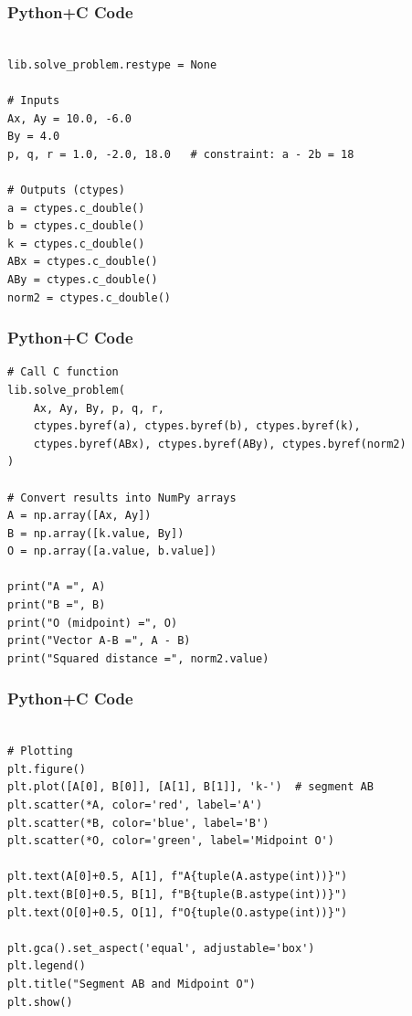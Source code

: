 \documentclass{beamer}
\begin{document}
\begin{frame}[fragile]
    \frametitle{Python+C Code}
    \begin{lstlisting}

lib.solve_problem.restype = None

# Inputs
Ax, Ay = 10.0, -6.0
By = 4.0
p, q, r = 1.0, -2.0, 18.0   # constraint: a - 2b = 18

# Outputs (ctypes)
a = ctypes.c_double()
b = ctypes.c_double()
k = ctypes.c_double()
ABx = ctypes.c_double()
ABy = ctypes.c_double()
norm2 = ctypes.c_double()

\end{lstlisting}
\end{frame}
\begin{frame}[fragile]
    \frametitle{Python+C Code}
    \begin{lstlisting}
# Call C function
lib.solve_problem(
    Ax, Ay, By, p, q, r,
    ctypes.byref(a), ctypes.byref(b), ctypes.byref(k),
    ctypes.byref(ABx), ctypes.byref(ABy), ctypes.byref(norm2)
)

# Convert results into NumPy arrays
A = np.array([Ax, Ay])
B = np.array([k.value, By])
O = np.array([a.value, b.value])

print("A =", A)
print("B =", B)
print("O (midpoint) =", O)
print("Vector A-B =", A - B)
print("Squared distance =", norm2.value)
\end{lstlisting}
\end{frame}
\begin{frame}[fragile]
    \frametitle{Python+C Code}
    \begin{lstlisting}

# Plotting
plt.figure()
plt.plot([A[0], B[0]], [A[1], B[1]], 'k-')  # segment AB
plt.scatter(*A, color='red', label='A')
plt.scatter(*B, color='blue', label='B')
plt.scatter(*O, color='green', label='Midpoint O')

plt.text(A[0]+0.5, A[1], f"A{tuple(A.astype(int))}")
plt.text(B[0]+0.5, B[1], f"B{tuple(B.astype(int))}")
plt.text(O[0]+0.5, O[1], f"O{tuple(O.astype(int))}")

plt.gca().set_aspect('equal', adjustable='box')
plt.legend()
plt.title("Segment AB and Midpoint O")
plt.show()

\end{lstlisting}
\end{frame}
\end{document}

